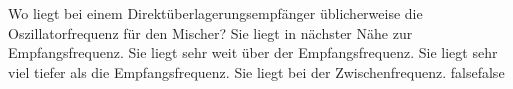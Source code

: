     {Wo liegt bei einem Direktüberlagerungsempfänger üblicherweise die Oszillatorfrequenz für den Mischer?}
    {Sie liegt in nächster Nähe zur Empfangsfrequenz.}
    {Sie liegt sehr weit über der Empfangsfrequenz.}
    {Sie liegt sehr viel tiefer als die Empfangsfrequenz.}
    {Sie liegt bei der Zwischenfrequenz. }
    {false}{false}